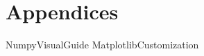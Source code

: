 \documentclass[opener-c,labs,black,nociteref]{HJnewsiambook}
\begin{document}
\part{Appendices} %
\begin{appendices}
{NumpyVisualGuide}
{MatplotlibCustomization}
\end{appendices}



\end{document}

